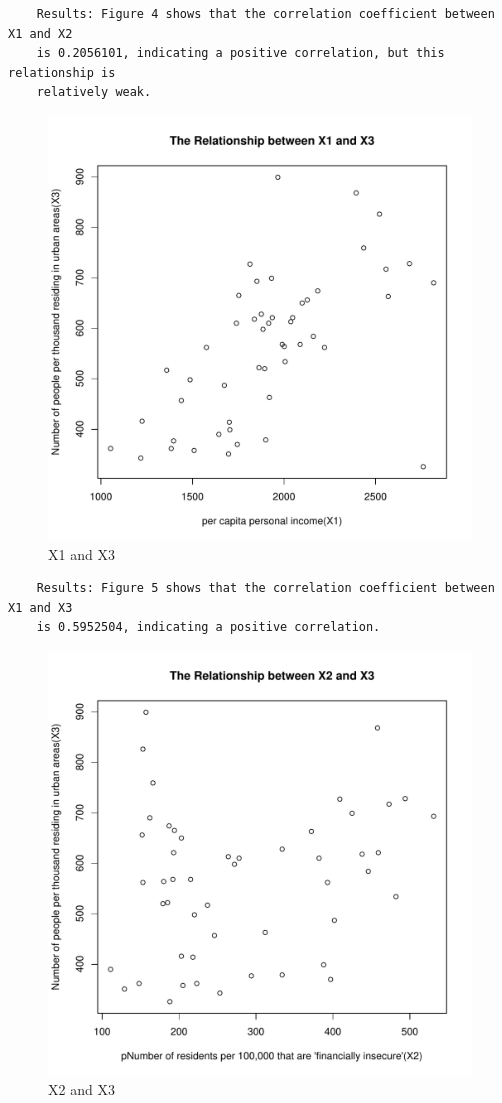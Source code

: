 \documentclass[12pt,letterpaper]{article}
\begin{document}
\begin{itemize}
\begin{verbatim} 
	Results: Figure 4 shows that the correlation coefficient between X1 and X2 
	is 0.2056101, indicating a positive correlation, but this relationship is 
	relatively weak.
\end{verbatim}

\newpage
\begin{figure}[h!]\centering
	\caption{\footnotesize X1 and X3}
	\label{fig:plot_5}
	\includegraphics[width=.75\textwidth]{scatter_plot5_X1&X3.pdf}
\end{figure}

\begin{verbatim} 
	Results: Figure 5 shows that the correlation coefficient between X1 and X3 
	is 0.5952504, indicating a positive correlation.
\end{verbatim}

\newpage
\begin{figure}[h!]\centering
	\caption{\footnotesize X2 and X3}
	\label{fig:plot_6}
	\includegraphics[width=.75\textwidth]{scatter_plot6_X2&X3.pdf}
\end{figure}


\end{itemize}
\end{document}
